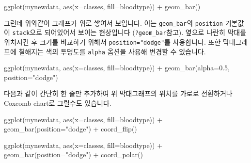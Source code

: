\documentclass[
]{book}
\newenvironment{Shaded}{\begin{snugshade}}{\end{snugshade}}
\newcommand{\AttributeTok}[1]{\textcolor[rgb]{0.77,0.63,0.00}{#1}}
\newcommand{\FloatTok}[1]{\textcolor[rgb]{0.00,0.00,0.81}{#1}}
\newcommand{\FunctionTok}[1]{\textcolor[rgb]{0.00,0.00,0.00}{#1}}
\newcommand{\NormalTok}[1]{#1}
\newcommand{\SpecialCharTok}[1]{\textcolor[rgb]{0.00,0.00,0.00}{#1}}
\newcommand{\StringTok}[1]{\textcolor[rgb]{0.31,0.60,0.02}{#1}}
\begin{document}
\begin{Shaded}
\begin{Highlighting}[]
\FunctionTok{ggplot}\NormalTok{(mynewdata, }\FunctionTok{aes}\NormalTok{(}\AttributeTok{x=}\NormalTok{classes, }\AttributeTok{fill=}\NormalTok{bloodtype)) }\SpecialCharTok{+}
  \FunctionTok{geom\_bar}\NormalTok{()}
\end{Highlighting}
\end{Shaded}

그런데 위와같이 그래프가 위로 쌓여서 보입니다. 이는 \texttt{geom\_bar}의 \texttt{position} 기본값이 \texttt{stack}으로 되어있어서 보이는 현상입니다 (\texttt{?geom\_bar}참고). 옆으로 나란히 막대를 위치시킨 후 크기를 비교하기 위해서 \texttt{position="dodge"}를 사용합니다. 또한 막대그래프에 칠해지는 색의 투명도를 \texttt{alpha} 옵션을 사용해 변경할 수 있습니다.

\begin{Shaded}
\begin{Highlighting}[]
\FunctionTok{ggplot}\NormalTok{(mynewdata, }\FunctionTok{aes}\NormalTok{(}\AttributeTok{x=}\NormalTok{classes, }\AttributeTok{fill=}\NormalTok{bloodtype)) }\SpecialCharTok{+}
  \FunctionTok{geom\_bar}\NormalTok{(}\AttributeTok{alpha=}\FloatTok{0.5}\NormalTok{, }\AttributeTok{position=}\StringTok{"dodge"}\NormalTok{)}
\end{Highlighting}
\end{Shaded}

다음과 같이 간단히 한 줄만 추가하여 위 막대그래프의 위치를 가로로 전환하거나 Coxcomb chart로 그릴수도 있습니다.

\begin{Shaded}
\begin{Highlighting}[]
\FunctionTok{ggplot}\NormalTok{(mynewdata, }\FunctionTok{aes}\NormalTok{(}\AttributeTok{x=}\NormalTok{classes, }\AttributeTok{fill=}\NormalTok{bloodtype)) }\SpecialCharTok{+}
  \FunctionTok{geom\_bar}\NormalTok{(}\AttributeTok{position=}\StringTok{"dodge"}\NormalTok{) }\SpecialCharTok{+}
  \FunctionTok{coord\_flip}\NormalTok{()}
\end{Highlighting}
\end{Shaded}

\begin{Shaded}
\begin{Highlighting}[]
\FunctionTok{ggplot}\NormalTok{(mynewdata, }\FunctionTok{aes}\NormalTok{(}\AttributeTok{x=}\NormalTok{classes, }\AttributeTok{fill=}\NormalTok{bloodtype)) }\SpecialCharTok{+}
  \FunctionTok{geom\_bar}\NormalTok{(}\AttributeTok{position=}\StringTok{"dodge"}\NormalTok{) }\SpecialCharTok{+}
  \FunctionTok{coord\_polar}\NormalTok{()}
\end{Highlighting}
\end{Shaded}
\end{document}
